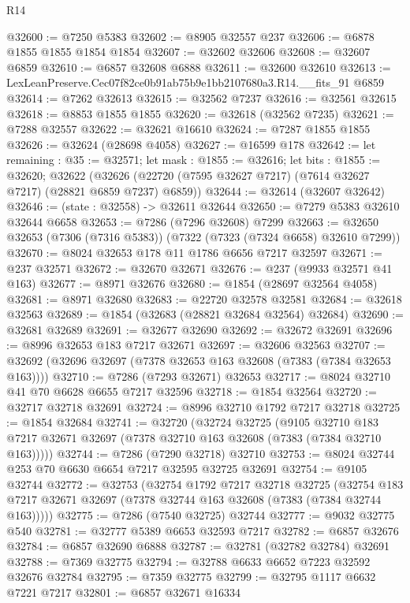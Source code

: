 \begin{lexlean}{R14}
\begin{coremodule}
@32600 := @7250 @5383
@32602 := @8905 @32557 @237
@32606 := @6878 @1855 @1855 @1854 @1854
@32607 := @32602 @32606
@32608 := @32607 @6859
@32610 := @6857 @32608 @6888
@32611 := @32600 @32610
@32613 := LexLeanPreserve.Cec07f82ce0b91ab75b9e1bb2107680a3.R14.__fits_91 @6859
@32614 := @7262 @32613
@32615 := @32562 @7237
@32616 := @32561 @32615
@32618 := @8853 @1855 @1855
@32620 := @32618 (@32562 @7235)
@32621 := @7288 @32557
@32622 := @32621 @16610
@32624 := @7287 @1855 @1855
@32626 := @32624 (@28698 @4058)
@32627 := @16599 @178
@32642 := let remaining : @35 := @32571;
  let mask : @1855 := @32616;
  let bits : @1855 := @32620;
  @32622 (@32626 (@22720 (@7595 @32627 @7217) (@7614 @32627 @7217) (@28821 @6859 @7237) @6859))
@32644 := @32614 (@32607 @32642)
@32646 := (state : @32558) -> @32611 @32644
@32650 := @7279 @5383 @32610 @32644 @6658
@32653 := @7286 (@7296 @32608) @7299
@32663 := @32650 @32653 (@7306 (@7316 @5383)) (@7322 (@7323 (@7324 @6658) @32610 @7299))
@32670 := @8024 @32653 @178 @11 @1786 @6656 @7217 @32597
@32671 := @237 @32571
@32672 := @32670 @32671
@32676 := @237 (@9933 @32571 @41 @163)
@32677 := @8971 @32676
@32680 := @1854 (@28697 @32564 @4058)
@32681 := @8971 @32680
@32683 := @22720 @32578 @32581
@32684 := @32618 @32563
@32689 := @1854 (@32683 (@28821 @32684 @32564) @32684)
@32690 := @32681 @32689
@32691 := @32677 @32690
@32692 := @32672 @32691
@32696 := @8996 @32653 @183 @7217 @32671
@32697 := @32606 @32563
@32707 := @32692 (@32696 @32697 (@7378 @32653 @163 @32608 (@7383 (@7384 @32653 @163))))
@32710 := @7286 (@7293 @32671) @32653
@32717 := @8024 @32710 @41 @70 @6628 @6655 @7217 @32596
@32718 := @1854 @32564
@32720 := @32717 @32718 @32691
@32724 := @8996 @32710 @1792 @7217 @32718
@32725 := @1854 @32684
@32741 := @32720
    (@32724
      @32725
      (@9105
        @32710
        @183
        @7217
        @32671
        @32697
        (@7378 @32710 @163 @32608 (@7383 (@7384 @32710 @163)))))
@32744 := @7286 (@7290 @32718) @32710
@32753 := @8024 @32744 @253 @70 @6630 @6654 @7217 @32595 @32725 @32691
@32754 := @9105 @32744
@32772 := @32753
    (@32754
      @1792
      @7217
      @32718
      @32725
      (@32754 @183 @7217 @32671 @32697 (@7378 @32744 @163 @32608 (@7383 (@7384 @32744 @163)))))
@32775 := @7286 (@7540 @32725) @32744
@32777 := @9032 @32775 @540
@32781 := @32777 @5389 @6653 @32593 @7217
@32782 := @6857 @32676
@32784 := @6857 @32690 @6888
@32787 := @32781 (@32782 @32784) @32691
@32788 := @7369 @32775
@32794 := @32788 @6633 @6652 @7223 @32592 @32676 @32784
@32795 := @7359 @32775
@32799 := @32795 @1117 @6632 @7221 @7217
@32801 := @6857 @32671 @16334

\end{coremodule}
\end{lexlean}
